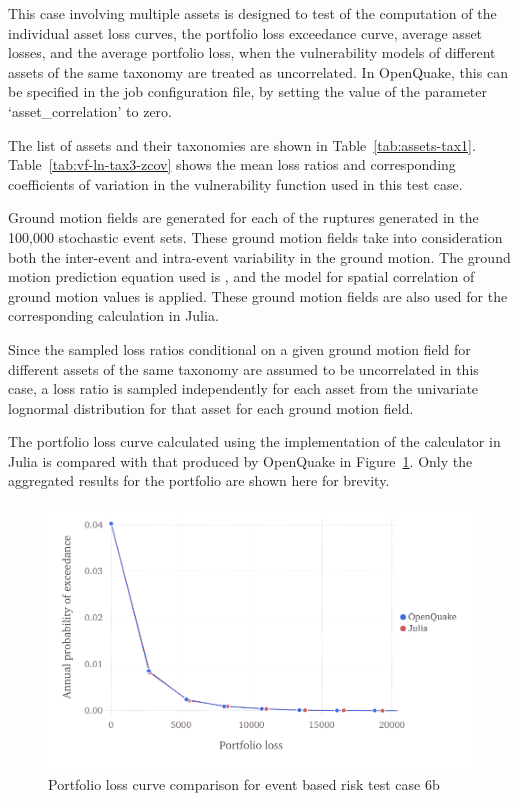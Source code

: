 This case involving multiple assets is designed to test of the computation of the individual asset loss curves, the portfolio loss exceedance curve, average asset losses, and the average portfolio loss, when the vulnerability models of different assets of the same taxonomy are treated as uncorrelated. In OpenQuake, this can be specified in the job configuration file, by setting the value of the parameter `asset\_correlation' to zero.

The list of assets and their taxonomies are shown in Table~\ref{tab:assets-tax1}. Table~\ref{tab:vf-ln-tax3-zcov} shows the mean loss ratios and corresponding coefficients of variation in the vulnerability function used in this test case.

Ground motion fields are generated for each of the ruptures generated in the 100,000 stochastic event sets. These ground motion fields take into consideration both the inter-event and intra-event variability in the ground motion. The ground motion prediction equation used is \citet{boore2008}, and the \citet{jayaram2009} model for spatial correlation of ground motion values is applied. These ground motion fields are also used for the corresponding calculation in Julia.

Since the sampled loss ratios conditional on a given ground motion field for different assets of the same taxonomy are assumed to be uncorrelated in this case, a loss ratio is sampled independently for each asset from the univariate lognormal distribution for that asset for each ground motion field.

The portfolio loss curve calculated using the implementation of the calculator in Julia is compared with that produced by OpenQuake in Figure~\ref{fig:lc-ebr-6b}. Only the aggregated results for the portfolio are shown here for brevity.

\begin{figure}[htbp]
\centering
\includegraphics[width=12cm]{qareport/figures/fig-lc-ebr-6b}
\caption{Portfolio loss curve comparison for event based risk test case 6b}
\label{fig:lc-ebr-6b}
\end{figure}